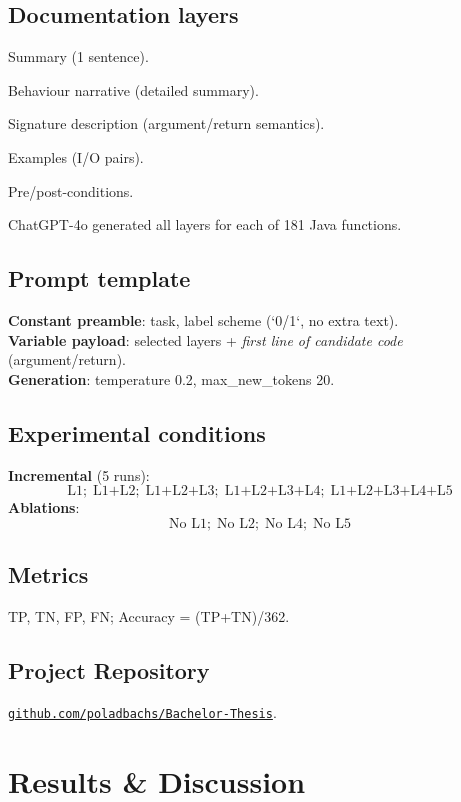 \documentclass[a4paper]{usiinfbachelorproject}
\begin{document}
\subsection{Documentation layers}\label{sec:layers}
\begin{description}[style=nextline,leftmargin=15pt]
  \item[L1] Summary (1 sentence).  
  \item[L2] Behaviour narrative (detailed summary).  
  \item[L3] Signature description (argument/return semantics).  
  \item[L4] Examples (I/O pairs).  
  \item[L5] Pre/post-conditions.  
\end{description}
ChatGPT-4o generated all layers for each of 181 Java functions.

\subsection{Prompt template}
\textbf{Constant preamble}: task, label scheme (`0/1`, no extra text).\\
\textbf{Variable payload}: selected layers + \textit{first line of candidate code} (argument/return).\\
\textbf{Generation}: temperature 0.2, max\_new\_tokens 20.

\subsection{Experimental conditions}
\textbf{Incremental} (5 runs):
\[
\text{L1};\; \text{L1+L2};\; \text{L1+L2+L3};\; \text{L1+L2+L3+L4};\; \text{L1+L2+L3+L4+L5}
\]
\textbf{Ablations}:
\[
\text{No L1};\; \text{No L2};\; \text{No L4};\; \text{No L5}
\]

\subsection{Metrics}
TP, TN, FP, FN; Accuracy = (TP+TN)/362.

\subsection{Project Repository}
\href{https://github.com/poladbachs/Bachelor-Thesis}{\texttt{github.com/poladbachs/Bachelor-Thesis}}.

\section{Results \& Discussion}\label{sec:results}
\end{document}

